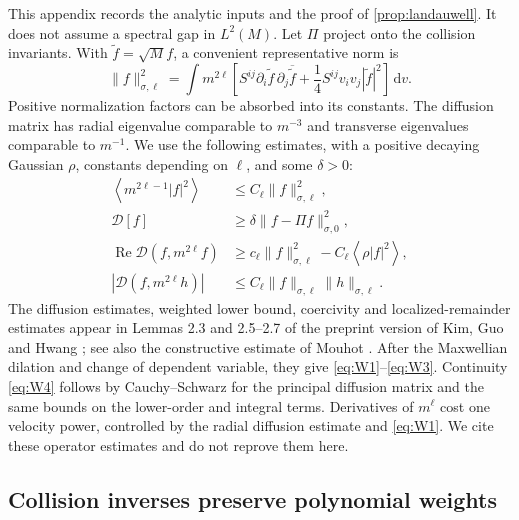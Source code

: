 \documentclass[11pt]{article}
\newcommand{\dd}{\,\mathrm d}
\newcommand{\av}[1]{\left\langle #1\right\rangle}
\newcommand{\D}{\mathcal D}
\newcommand{\Real}{\operatorname{Re}}
\theoremstyle{definition}
\theoremstyle{remark}
\numberwithin{equation}{section}
\begin{document}
This appendix records the analytic inputs and the proof of
\cref{prop:landauwell}. It does not assume a spectral gap in
$L^2(M)$. Let $\Pi$ project onto the collision invariants.
With $\widetilde f=\sqrt M f$, a convenient representative norm is
\[
 \|f\|_{\sigma,\ell}^2
  =\int m^{2\ell}\left[
   S^{ij}\partial_i\widetilde f\,\partial_j\overline{\widetilde f}
     +\frac14 S^{ij}v_iv_j|\widetilde f|^2\right]\dd v.
\]
Positive normalization factors can be absorbed into its constants.
The diffusion matrix has radial eigenvalue comparable to $m^{-3}$
and transverse eigenvalues comparable to $m^{-1}$.
We use the following estimates, with a positive decaying Gaussian
$\rho$, constants depending on $\ell$, and some $\delta>0$:
\begin{align}
 \av{m^{2\ell-1}|f|^2}&\leq C_\ell\|f\|_{\sigma,\ell}^2,
 \label{eq:W1}\\
 \D[f]&\geq\delta\|f-\Pi f\|_{\sigma,0}^2,
 \label{eq:W2}\\
 \Real\D(f,m^{2\ell}f)&\geq c_\ell\|f\|_{\sigma,\ell}^2
                         -C_\ell\av{\rho|f|^2},
 \label{eq:W3}\\
 |\D(f,m^{2\ell}h)|&\leq
              C_\ell\|f\|_{\sigma,\ell}\|h\|_{\sigma,\ell}.
 \label{eq:W4}
\end{align}
The diffusion estimates, weighted lower bound, coercivity and
localized-remainder estimates appear in Lemmas 2.3 and 2.5--2.7 of
the preprint version of Kim, Guo and Hwang
\cite{KimGuoHwang2020}; see also the constructive estimate
of Mouhot \cite{Mouhot2006}.
After the Maxwellian dilation and change of dependent variable, they
give \eqref{eq:W1}--\eqref{eq:W3}.
Continuity \eqref{eq:W4} follows by Cauchy--Schwarz for the principal
diffusion matrix and the same bounds on the lower-order and integral
terms. Derivatives of $m^\ell$ cost one velocity power, controlled
by the radial diffusion estimate and \eqref{eq:W1}.
We cite these operator estimates and do not reprove them here.

\subsection{Collision inverses preserve polynomial weights}
\end{document}
